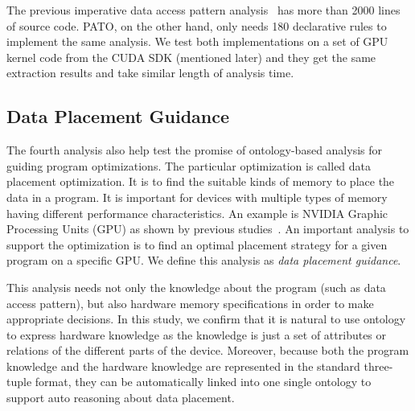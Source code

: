 

The previous imperative data access pattern
analysis~\cite{Chen2014} has more than 2000 lines of source code.
PATO, on the other hand, only needs 180 declarative rules to implement
the same analysis. We test both implementations on a set of GPU kernel code from the CUDA SDK (mentioned later) and
they get the same extraction results and take similar length of
analysis time. 

\subsection{Data Placement Guidance}
The fourth analysis also help test the promise of ontology-based
analysis for guiding program optimizations. The particular
optimization is called data placement optimization. It is to find the
suitable kinds of memory to place the data in a program. It is
important for devices with multiple types of memory having different
performance characteristics. An example is NVIDIA Graphic Processing
Units (GPU) as shown by previous studies~\cite{Chen2014, Jang2011}.
An important analysis to support the optimization is to find an
optimal placement strategy for a given program on a specific GPU.  We
define this analysis as {\em data placement guidance}.

This analysis needs not only the knowledge about the program (such as
data access pattern), but also hardware memory specifications in order
to make appropriate decisions.  In this study, we confirm that it is
natural to use ontology to express hardware knowledge as the knowledge
is just a set of attributes or relations of the different parts of the
device. Moreover, because both the program knowledge and the hardware
knowledge are represented in the standard three-tuple format, they can
be automatically linked into one single ontology to support auto
reasoning about data placement.

